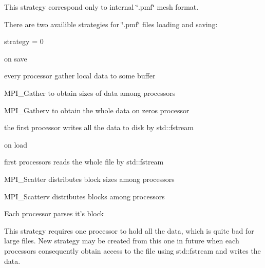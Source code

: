 This strategy correspond only to internal \char`\"{}.\-pmf\char`\"{} mesh format. 

There are two availible strategies for \char`\"{}.\-pmf\char`\"{} files loading and saving\-:

strategy = 0
\begin{DoxyItemize}
\item on save
\begin{DoxyEnumerate}
\item every processor gather local data to some buffer
\item M\-P\-I\-\_\-\-Gather to obtain sizes of data among processors
\item M\-P\-I\-\_\-\-Gatherv to obtain the whole data on zeros processor
\item the first processor writes all the data to disk by std\-::fstream
\end{DoxyEnumerate}
\item on load
\begin{DoxyEnumerate}
\item first processors reads the whole file by std\-::fstream
\item M\-P\-I\-\_\-\-Scatter distributes block sizes among processors
\item M\-P\-I\-\_\-\-Scatterv distributes blocks among processors
\item Each processor parses it's block
\end{DoxyEnumerate}
\end{DoxyItemize}

This strategy requires one processor to hold all the data, which is quite bad for large files. New strategy may be created from this one in future when each processors consequently obtain access to the file using std\-::fstream and writes the data.


